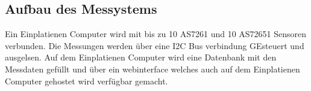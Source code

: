 \subsection{Aufbau des Messystems}
Ein Einplatienen Computer wird mit bis zu 10 AS7261 und 10 AS72651 Sensoren verbunden.
Die Messungen werden über eine I2C Bus verbindung GEsteuert und ausgelsen.
Auf dem Einplatienen Computer wird eine Datenbank mit den Messdaten gefüllt und über ein webinterface welches auch auf dem Einplatienen Computer gehostet wird verfügbar gemacht.
